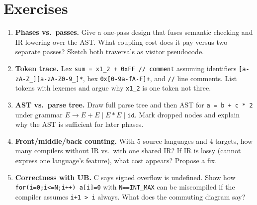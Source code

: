 \section{Exercises}
\label{sec:ch01-exercises}
\begin{enumerate}[label=E1.\arabic*, leftmargin=*, itemsep=0.8em]
\item \textbf{Phases vs.\ passes.} Give a one-pass design that fuses semantic checking and IR lowering over the AST. What coupling cost does it pay versus two separate passes? Sketch both traversals as visitor pseudocode.
\item \textbf{Token trace.} Lex \texttt{sum = x1\_2 + 0xFF // comment} assuming identifiers \texttt{[a-zA-Z\_][a-zA-Z0-9\_]*}, hex \texttt{0x[0-9a-fA-F]+}, and \texttt{//} line comments. List tokens with lexemes and argue why \texttt{x1\_2} is one token not three.
\item \textbf{AST vs.\ parse tree.} Draw full parse tree and then AST for \texttt{a = b + c * 2} under grammar $E \to E+E \mid E*E \mid \texttt{id}$. Mark dropped nodes and explain why the AST is sufficient for later phases.
\item \textbf{Front/middle/back counting.} With $5$ source languages and $4$ targets, how many compilers without IR vs.\ with one shared IR? If IR is lossy (cannot express one language's feature), what cost appears? Propose a fix.
\item \textbf{Correctness with UB.} C says signed overflow is undefined. Show how \texttt{for(i=0;i<=N;i++) a[i]=0} with \texttt{N==INT\_MAX} can be miscompiled if the compiler assumes \texttt{i+1 > i} always. What does the commuting diagram say?
\end{enumerate}
